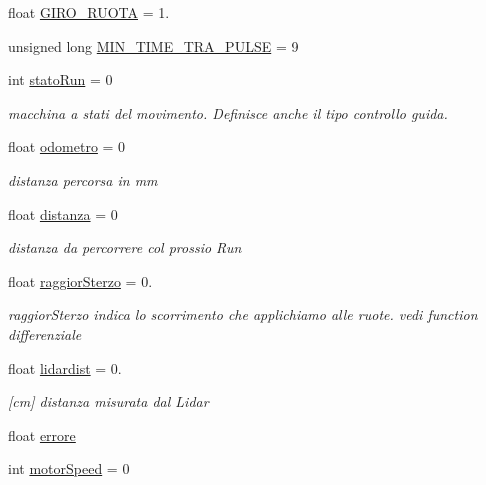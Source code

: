 \begin{DoxyCompactItemize}
float \mbox{\hyperlink{ari_pi__2_d_c__esp__08_8ino_ac57aebfcef0c4d31360b170366395c4a}{G\+I\+R\+O\+\_\+\+R\+U\+O\+TA}} = 1.
\item 
unsigned long \mbox{\hyperlink{ari_pi__2_d_c__esp__08_8ino_a6a8d27409d947dce17cce28a56701a5c}{M\+I\+N\+\_\+\+T\+I\+M\+E\+\_\+\+T\+R\+A\+\_\+\+P\+U\+L\+SE}} = 9
\item 
int \mbox{\hyperlink{ari_pi__2_d_c__esp__08_8ino_a5339db6126d080787f8511e2aae71e34}{stato\+Run}} = 0
\begin{DoxyCompactList}\small\item\em macchina a stati del movimento. Definisce anche il tipo controllo guida. \end{DoxyCompactList}\item 
float \mbox{\hyperlink{ari_pi__2_d_c__esp__08_8ino_ac36ade784c05554d24241a2fa860bbaa}{odometro}} = 0
\begin{DoxyCompactList}\small\item\em distanza percorsa in mm \end{DoxyCompactList}\item 
float \mbox{\hyperlink{ari_pi__2_d_c__esp__08_8ino_aa0ded4438d2bf98ac92bf5e3680d5084}{distanza}} = 0
\begin{DoxyCompactList}\small\item\em distanza da percorrere col prossio Run \end{DoxyCompactList}\item 
float \mbox{\hyperlink{ari_pi__2_d_c__esp__08_8ino_a6bd7fe73202cbe57f50f29e17bf7f1d2}{raggior\+Sterzo}} = 0.
\begin{DoxyCompactList}\small\item\em raggior\+Sterzo indica lo scorrimento che applichiamo alle ruote. vedi function differenziale \end{DoxyCompactList}\item 
float \mbox{\hyperlink{ari_pi__2_d_c__esp__08_8ino_a4a8018086ebb57f68726715ade9fc53d}{lidardist}} = 0.
\begin{DoxyCompactList}\small\item\em \mbox{[}cm\mbox{]} distanza misurata dal Lidar \end{DoxyCompactList}\item 
float \mbox{\hyperlink{ari_pi__2_d_c__esp__08_8ino_a249abd6fb895eba5af34eb2516a7dea3}{errore}}
\item 
int \mbox{\hyperlink{ari_pi__2_d_c__esp__08_8ino_a8dfd382ee3674a1db48ad2c69bcaaf56}{motor\+Speed}} = 0
\item 

\end{DoxyCompactItemize}
